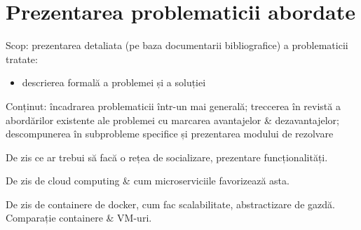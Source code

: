 \chapter{Prezentarea problematicii abordate}
Scop: prezentarea detaliata (pe baza documentarii bibliografice) a problematicii tratate:
\begin{itemize}
	\item descrierea formală a problemei și a soluției
\end{itemize}

Conținut: încadrarea problematicii într-un mai generală; treccerea în revistă a abordărilor existente ale problemei cu marcarea avantajelor \& dezavantajelor; descompunerea în subprobleme specifice și prezentarea modului de rezolvare

De zis ce ar trebui să facă o rețea de socializare, prezentare funcționalități.

De zis de cloud computing \& cum microserviciile favorizează asta.

De zis de containere de docker, cum fac scalabilitate, abstractizare de gazdă. Comparație containere \& VM-uri.
